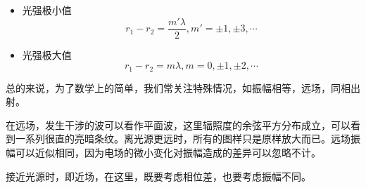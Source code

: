 \begin{corollary}{}

\begin{itemize}
\item 光强极小值 
\begin{equation}
r_1 - r_2 = \dfrac{ m' \lambda} { 2 } , m' = \pm 1, \pm 3, \cdots
\end{equation}

\item 光强极大值 
\begin{equation}\label{eq_IntCos_1}
 r_1 - r_2 = m \lambda , m = 0 , \pm 1, \pm 2,\cdots 
\end{equation}

\end{itemize}

\end{corollary}


总的来说，为了数学上的简单，我们常关注特殊情况，如振幅相等，远场，同相出射。

在远场，发生干涉的波可以看作平面波，这里辐照度的余弦平方分布成立，可以看到一系列很直的亮暗条纹。离光源更远时，所有的图样只是原样放大而已。远场振幅可以近似相同，因为电场的微小变化对振幅造成的差异可以忽略不计。

接近光源时，即近场，在这里，既要考虑相位差，也要考虑振幅不同。








